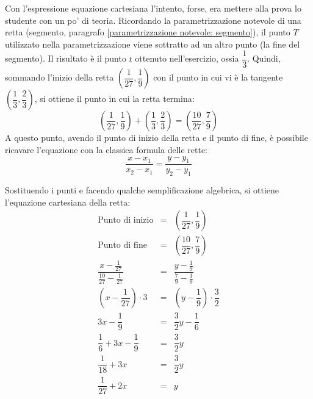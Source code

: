 \documentclass[a4paper]{article}
\begin{document}
	Con l'espressione equazione cartesiana l'intento, forse, era mettere alla prova lo studente con un po' di teoria. Ricordando la parametrizzazione notevole di una retta (segmento, paragrafo \ref{parametrizzazione notevole: segmento}), il punto $T$ utilizzato nella parametrizzazione viene sottratto ad un altro punto (la fine del segmento). Il risultato è il punto $t$ ottenuto nell'esercizio, ossia $\dfrac{1}{3}$. Quindi, sommando l'inizio della retta $\left(\dfrac{1}{27}, \dfrac{1}{9}\right)$ con il punto in cui vi è la tangente $\left(\dfrac{1}{3}, \dfrac{2}{3}\right)$, si ottiene il punto in cui la retta termina:
	\begin{equation*}
		\left(\dfrac{1}{27}, \dfrac{1}{9}\right) + \left(\dfrac{1}{3}, \dfrac{2}{3}\right) 
		= 
		\left(\dfrac{10}{27}, \dfrac{7}{9}\right)
	\end{equation*}
	A questo punto, avendo il punto di inizio della retta e il punto di fine, è possibile ricavare l'equazione con la classica formula delle rette:
	\begin{equation*}
		\dfrac{x-x_{1}}{x_{2}-x_{1}} = \dfrac{y-y_{1}}{y_{2}-y_{1}}
	\end{equation*}\newpage

	\noindent
	Sostituendo i punti e facendo qualche semplificazione algebrica, si ottiene l'equazione cartesiana della retta:
	\begin{equation*}
		\begin{array}{rcl}
			\text{Punto di inizio}	&=& \left(\dfrac{1}{27}, \dfrac{1}{9}\right) \\ [1em]
			\text{Punto di fine}	&=& \left(\dfrac{10}{27}, \dfrac{7}{9}\right) \\ [1.5em]
			\dfrac{x-\frac{1}{27}}{\frac{10}{27}-\frac{1}{27}} &=& \dfrac{y-\frac{1}{9}}{\frac{7}{9}-\frac{1}{9}} \\ [1em]
			\left(x-\dfrac{1}{27}\right) \cdot 3 &=& \left(y-\dfrac{1}{9}\right) \cdot \dfrac{3}{2} \\ [1.5em]
			3x - \dfrac{1}{9} &=& \dfrac{3}{2}y - \dfrac{1}{6} \\ [1.5em]
			\dfrac{1}{6} + 3x - \dfrac{1}{9} &=& \dfrac{3}{2}y \\ [1.5em]
			\dfrac{1}{18} + 3x &=& \dfrac{3}{2}y \\ [1.5em]
			\dfrac{1}{27} + 2x &=& y
		\end{array}
	\end{equation*}\newpage
\end{document}
